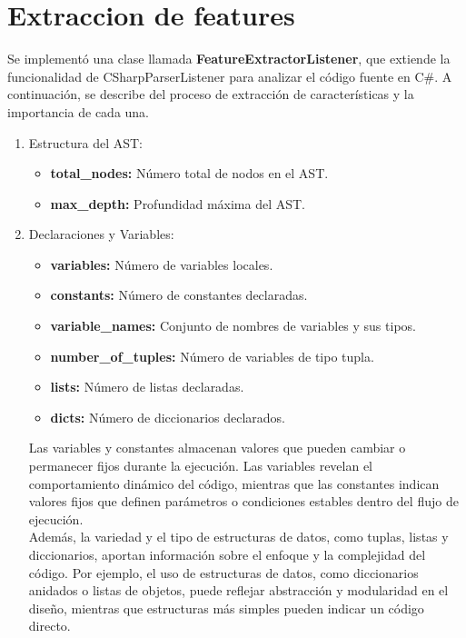 \section{Extraccion de features}

 Se implementó una clase llamada {\bf FeatureExtractorListener}, que extiende la funcionalidad de CSharpParserListener para analizar el código fuente en C\#. A continuación, se describe del proceso de extracción de características y la importancia de cada una. \\

\begin{enumerate}
	\item Estructura del AST:
    		\begin{itemize}
			\item {\bf total\_nodes:} Número total de nodos en el AST.
			\item {\bf max\_depth:} Profundidad máxima del AST.
		\end{itemize}
		
	 \item Declaraciones y Variables:
    \begin{itemize}
        \item {\bf variables:} Número de variables locales.
        \item {\bf constants:} Número de constantes declaradas.
        \item {\bf variable\_names:} Conjunto de nombres de variables y sus tipos.
        \item {\bf number\_of\_tuples:} Número de variables de tipo tupla.
        \item {\bf lists:} Número de listas declaradas.
        \item {\bf dicts:} Número de diccionarios declarados.
    \end{itemize}
    
Las variables y constantes almacenan valores que pueden cambiar o permanecer fijos durante la ejecución. Las variables revelan el comportamiento dinámico del código, mientras que las constantes indican valores fijos que definen parámetros o condiciones estables dentro del flujo de ejecución.\\

Además, la variedad y el tipo de estructuras de datos, como tuplas, listas y diccionarios, aportan información sobre el enfoque y la complejidad del código. Por ejemplo, el uso de estructuras de datos, como diccionarios anidados o listas de objetos, puede reflejar abstracción y modularidad en el diseño, mientras que estructuras más simples pueden indicar un código directo.


\end{enumerate}
